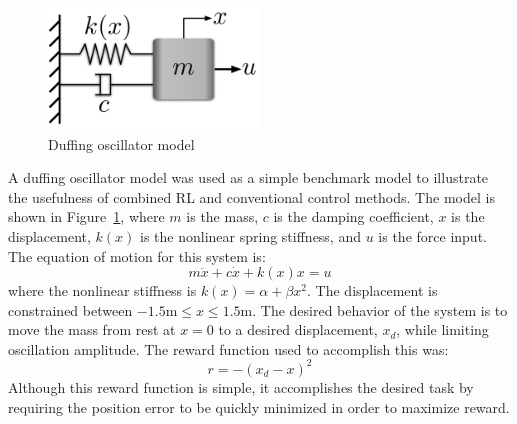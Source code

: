 %
\begin{figure}[t]
\begin{center}
\includegraphics[width = 0.5\textwidth]{figures/figures_RL_model_based_control/Duffing_oscillator.pdf}
\caption{Duffing oscillator model}
\label{fig_chap2:duffing_model}
\end{center}
\end{figure}
% 
A duffing oscillator model was used as a simple benchmark model to illustrate the usefulness of combined RL and conventional control methods. The model is shown in Figure~\ref{fig_chap2:duffing_model}, where $m$ is the mass, $c$ is the damping coefficient, $x$ is the displacement, $k(x)$ is the nonlinear spring stiffness, and $u$ is the force input. The equation of motion for this system is:
%
\begin{equation}
m\ddot{x} + c\dot{x} + k(x)x = u
\label{eq_chap_2:duffing_EOM}
\end{equation}
%
where the nonlinear stiffness is
$k(x)=\alpha + \beta x^2$.
The displacement is constrained between $-1.5\si{\meter}\leq x \leq 1.5\si{\meter}$. The desired behavior of the system is to move the mass from rest at $x=0$ to a desired displacement, $x_d$, while limiting oscillation amplitude. The reward function used to accomplish this was:
%
\begin{equation}
    r = -(x_d - x)^2
    \label{eq_chap2:duffing_reward_function}
\end{equation}
%
Although this reward function is simple, it accomplishes the desired task by requiring the position error to be quickly minimized in order to maximize reward.

